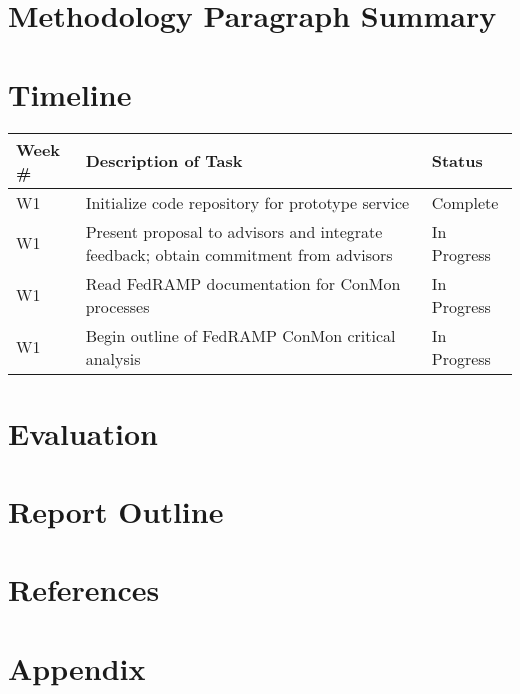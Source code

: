 \documentclass{jdf}
\begin{document}
\section{Methodology Paragraph Summary}

\section{Timeline}

\begin{table}[h]
\begin{tabularx}{\textwidth}{|l|X|l|}
    \hline
    Week \# & Description of Task & Status \\ [0.5ex] 
    \hline
    W1 & Initialize code repository for prototype service & Complete \\
    \hline
    W1 & Present proposal to advisors and integrate feedback; obtain commitment from advisors & In Progress \\
    \hline
    W1 & Read FedRAMP documentation for ConMon processes & In Progress \\
    \hline
    W1 & Begin outline of FedRAMP ConMon critical analysis & In Progress \\
    \hline
\end{tabularx}
\end{table}

\section{Evaluation}

\section{Report Outline}

\section{References}

\nocite{*}



\section{Appendix}
\end{document}

